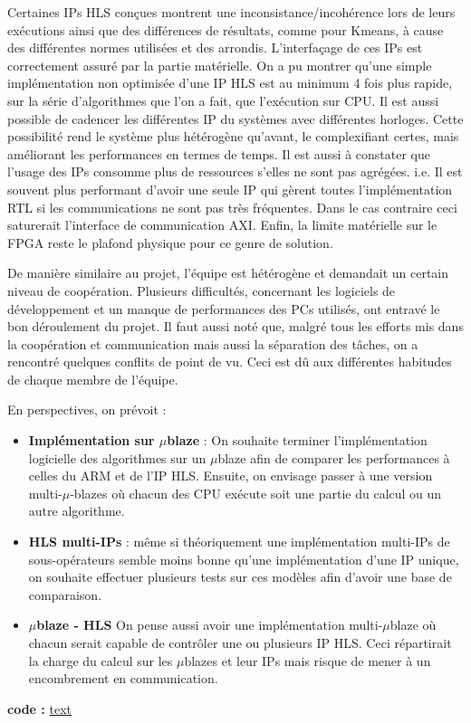 \documentclass[12pt,a4paper]{article}
\begin{document}
Certaines IPs HLS conçues montrent une inconsistance/incohérence lors de leurs exécutions ainsi que des différences de résultats, comme pour Kmeans, à cause des différentes normes utilisées et des arrondis. L'interfaçage de ces IPs est correctement assuré par la partie matérielle. On a pu montrer qu'une simple implémentation non optimisée d'une IP HLS est au minimum 4 fois plus rapide, sur la série d'algorithmes que l'on a fait, que l'exécution sur CPU. Il est aussi possible de cadencer les différentes IP du systèmes avec différentes horloges. Cette possibilité rend le système plus hétérogène qu'avant, le complexifiant certes, mais améliorant les performances en termes de temps. Il est aussi à constater que l'usage des IPs consomme plus de ressources s'elles ne sont pas agrégées. i.e. Il est souvent plus performant d'avoir une seule IP qui gèrent toutes l'implémentation RTL si les communications ne sont pas très fréquentes. Dans le cas contraire ceci saturerait l'interface de communication AXI. Enfin, la limite matérielle sur le FPGA reste le plafond physique pour ce genre de solution.


De manière similaire au projet, l'équipe est hétérogène et demandait un certain niveau de coopération. Plusieurs difficultés, concernant les logiciels de développement et un manque de performances des PCs utilisés, ont entravé le bon déroulement du projet. Il faut aussi noté que, malgré tous les efforts mis dans la coopération et communication mais aussi la séparation des tâches, on a rencontré quelques conflits de point de vu. Ceci est dû aux différentes habitudes de chaque membre de l'équipe.


En perspectives, on prévoit :

\begin{itemize}
\item \textbf{Implémentation sur $\mu$blaze} : On souhaite terminer l'implémentation logicielle des algorithmes sur un $\mu$blaze afin de comparer les performances à celles du ARM et de l'IP HLS. Ensuite, on envisage passer à une version multi-$\mu$-blazes où chacun des CPU exécute soit une partie du calcul ou un autre algorithme.
\item \textbf{HLS multi-IPs} : même si théoriquement une implémentation multi-IPs de sous-opérateurs semble moins bonne qu'une implémentation d'une IP unique, on souhaite effectuer plusieurs tests sur ces modèles afin d'avoir une base de comparaison.
\item \textbf{$\mu$blaze - HLS} On pense aussi avoir une implémentation multi-$\mu$blaze où chacun serait capable de contrôler une ou plusieurs IP HLS. Ceci répartirait la charge du calcul sur les $\mu$blazes et leur IPs mais risque de mener à un encombrement en communication.
\end{itemize}


\vfill
\textbf{code :} \href{}{text}
\end{document}
